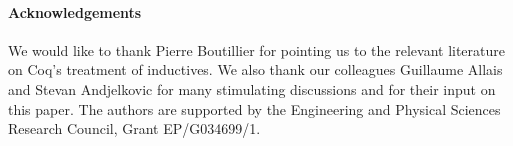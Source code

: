 \documentclass{scrartcl}
\theoremstyle{plain}
\theoremstyle{definition}
\begin{document}
\paragraph{Acknowledgements} 
We would like to thank Pierre Boutillier for pointing us to the
relevant literature on Coq's treatment of inductives. We also thank
our colleagues Guillaume Allais and Stevan Andjelkovic for many
stimulating discussions and for their input on this paper. The authors
are supported by the Engineering and Physical Sciences Research
Council, Grant EP/G034699/1.



\newpage

 
\end{document}

